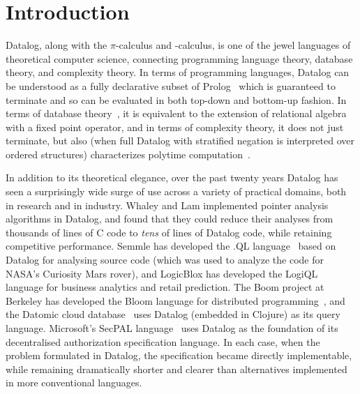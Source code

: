 \section{Introduction}
\label{sec:intro}

Datalog, along with the $\pi$-calculus and \fn-calculus, is one of the jewel
languages of theoretical computer science, connecting programming language
theory, database theory, and complexity theory. In terms of programming
languages, Datalog can be understood as a fully declarative subset of
Prolog~\cite{datalog-from-prolog} which is guaranteed to terminate and so can be
evaluated in both top-down and bottom-up fashion. In terms of database
theory~\cite{datalog-relalg}, it is equivalent to the extension of relational
algebra with a fixed point operator, and in terms of complexity theory, it does
not just terminate, but also (when full Datalog with stratified negation is
interpreted over ordered structures) characterizes polytime
computation~\cite{datalog-polytime}.

In addition to its theoretical elegance, over the past twenty years
Datalog has seen a surprisingly wide surge of use across a variety of
practical domains, both in research and in industry. Whaley and Lam
\cite{whaley-lam,whaley-phd} implemented pointer analysis algorithms
in Datalog, and found that they could reduce their analyses from
thousands of lines of C code to \emph{tens} of lines of Datalog code,
while retaining competitive performance. Semmle has developed the .QL
language~\cite{semmlecode,ql-inference} based on Datalog for analysing
source code (which was used to analyze the code for NASA's Curiosity
Mars rover), and LogicBlox has developed the LogiQL~\cite{logicblox}
language for business analytics and retail prediction. The Boom
project at Berkeley has developed the Bloom language for distributed
programming~\cite{bloom}, and the Datomic cloud
database~\cite{datomic} uses Datalog (embedded in Clojure) as its
query language. Microsoft's SecPAL language~\cite{secpal} uses Datalog
as the foundation of its decentralised authorization specification
language. In each case, when the problem formulated in Datalog, the
specification became directly implementable, while remaining
dramatically shorter and clearer than alternatives implemented in more
conventional languages.



